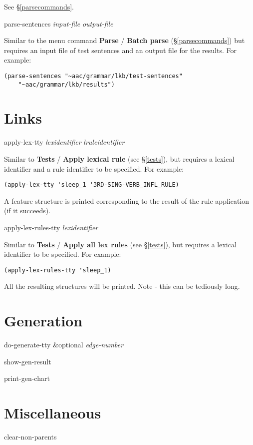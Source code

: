 \documentclass[12pt]{report}
\newcommand{\lispcommand}[1]{\noindent\rm #1}%
\begin{document}
See \S\ref{parsecommands}.

\lispcommand{parse-sentences {\it input-file} {\it output-file}}

Similar to the menu command {\bf Parse} / {\bf Batch parse}
 (\S\ref{parsecommands}) but requires an input file of test sentences
and an output file for the results.  For example:
\begin{verbatim}
(parse-sentences "~aac/grammar/lkb/test-sentences" 
    "~aac/grammar/lkb/results")
\end{verbatim}

\section{Links}
\lispcommand{apply-lex-tty {\it lexidentifier} {\it lruleidentifier}}

Similar to {\bf Tests} / {\bf Apply lexical rule} (see \S\ref{tests}),
but requires a lexical identifier and a rule identifier to be specified.
For example:
\begin{verbatim}
(apply-lex-tty 'sleep_1 '3RD-SING-VERB_INFL_RULE)
\end{verbatim}
A feature structure is printed corresponding to the result 
of the rule application (if it succeeds).

\lispcommand{apply-lex-rules-tty {\it lexidentifier} }

Similar to {\bf Tests} / {\bf Apply all lex rules} (see \S\ref{tests}),
but requires a lexical identifier to be specified.
For example:
\begin{verbatim}
(apply-lex-rules-tty 'sleep_1)
\end{verbatim}
All the resulting structures will be printed.  Note - this can be
tediously long.

\section{Generation}

\lispcommand{do-generate-tty \&optional {\it edge-number}}

\lispcommand{show-gen-result}

\lispcommand{print-gen-chart}

\section{Miscellaneous}

\lispcommand{clear-non-parents}
\end{document}
